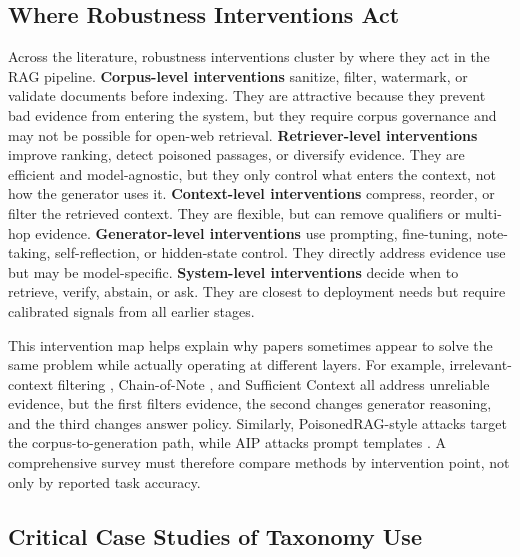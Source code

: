 \documentclass[11pt]{article}
\begin{document}
\subsection{Where Robustness Interventions Act}

Across the literature, robustness interventions cluster by where they act in the RAG pipeline. \textbf{Corpus-level interventions} sanitize, filter, watermark, or validate documents before indexing. They are attractive because they prevent bad evidence from entering the system, but they require corpus governance and may not be possible for open-web retrieval. \textbf{Retriever-level interventions} improve ranking, detect poisoned passages, or diversify evidence. They are efficient and model-agnostic, but they only control what enters the context, not how the generator uses it. \textbf{Context-level interventions} compress, reorder, or filter the retrieved context. They are flexible, but can remove qualifiers or multi-hop evidence. \textbf{Generator-level interventions} use prompting, fine-tuning, note-taking, self-reflection, or hidden-state control. They directly address evidence use but may be model-specific. \textbf{System-level interventions} decide when to retrieve, verify, abstain, or ask. They are closest to deployment needs but require calibrated signals from all earlier stages.

This intervention map helps explain why papers sometimes appear to solve the same problem while actually operating at different layers. For example, irrelevant-context filtering \citep{irrelevantContext2023}, Chain-of-Note \citep{chainOfNote2023}, and Sufficient Context \citep{sufficientContext2024} all address unreliable evidence, but the first filters evidence, the second changes generator reasoning, and the third changes answer policy. Similarly, PoisonedRAG-style attacks \citep{poisonedRAG2024} target the corpus-to-generation path, while AIP attacks prompt templates \citep{aip2025}. A comprehensive survey must therefore compare methods by intervention point, not only by reported task accuracy.

\subsection{Critical Case Studies of Taxonomy Use}

\end{document}
